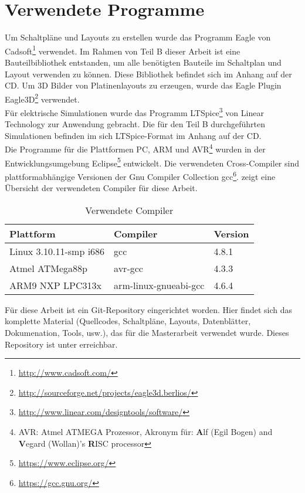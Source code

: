 \section{Verwendete Programme}
Um Schaltpläne und Layouts zu erstellen wurde das Programm Eagle von Cadsoft\footnote{\url{http://www.cadsoft.com/}} verwendet. Im Rahmen von Teil B dieser Arbeit ist eine Bauteilbibliothek entstanden, um alle benötigten Bauteile im Schaltplan und Layout verwenden zu können. Diese Bibliothek befindet sich im Anhang auf der CD.
Um 3D Bilder von Platinenlayouts zu erzeugen, wurde das Eagle Plugin Eagle3D\footnote{\url{http://sourceforge.net/projects/eagle3d.berlios/}} verwendet.\\
Für elektrische Simulationen wurde das Programm LTSpice\footnote{\url{http://www.linear.com/designtools/software/}} von Linear Technology zur Anwendung gebracht. Die für den Teil B durchgeführten Simulationen befinden im sich LTSpice-Format im Anhang auf der CD.\\
Die Programme für die Plattformen PC, ARM und AVR\footnote{AVR: Atmel ATMEGA Prozessor, Akronym für: \textbf{A}lf (Egil Bogen) and \textbf{V}egard (Wollan)'s \textbf{R}ISC processor} wurden in der Entwicklungsumgebung Eclipse\footnote{\url{https://www.eclipse.org/}} entwickelt. Die verwendeten Cross-Compiler sind plattformabhängige Versionen der Gnu Compiler Collection gcc\footnote{\url{https://gcc.gnu.org/}}.  zeigt eine Übersicht der verwendeten Compiler für diese Arbeit.

\begin{table}[h]
\begin{tabular}{|p{4.5cm}|p{4cm}|p{4cm}|}\hline
\rowcolor{TableBackgroundColor} 
\textbf{Plattform}		&	\textbf{Compiler}		&	\textbf{Version}  \\ \hline
 Linux 3.10.11-smp i686	&	gcc						& 4.8.1	\\ \hline
 Atmel ATMega88p		&	avr-gcc					& 4.3.3	\\ \hline
 ARM9 NXP LPC313x		&	arm-linux-gnueabi-gcc	& 4.6.4	\\ \hline
\end{tabular}
\caption{Verwendete Compiler}
\label{tab:verwendete_compiler}
\end{table}

Für diese Arbeit ist ein Git-Repository eingerichtet worden. Hier findet sich das komplette Material (Quellcodes, Schaltpläne, Layouts, Datenblätter, Dokumenation, Tools, usw.), das für die Masterarbeit verwendet wurde. Dieses Repository ist unter  erreichbar.